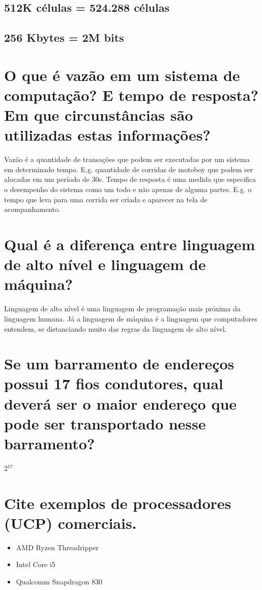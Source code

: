 \documentclass[11pt]{article}
\begin{document}
\subsection{512K células = 524.288 células}
\label{sec:org338395f}
\subsection{256 Kbytes = 2M bits}
\label{sec:orgb41b5b3}
\section{O que é vazão em um sistema de computação? E tempo de resposta? Em que circunstâncias são utilizadas estas informações?}
\label{sec:orgae451bd}
Vazão é a quantidade de transações que podem ser executadas por um sistema em
determinado tempo. E.g. quantidade de corridas de motoboy que podem ser alocadas
em um período de 30s.
Tempo de resposta é uma medida que especifica o desempenho do sistema como um
todo e não apenas de alguma partes. E.g. o tempo que leva para uma corrida ser
criada e aparecer na tela de acompanhamento.
\section{Qual é a diferença entre linguagem de alto nível e linguagem de máquina?}
\label{sec:org16e6fc2}
Linguagem de alto nível é uma linguagem de programação mais próxima da linguagem
humana. Já a linguagem de máquina é a linguagem que computadores entendem, se
distanciando muito das regras da linguagem de alto nível.
\section{Se um barramento de endereços possui 17 fios condutores, qual deverá ser o maior endereço que pode ser transportado nesse barramento?}
\label{sec:org9c9f886}
2\(^{\text{17}}\)
\section{Cite exemplos de processadores (UCP) comerciais.}
\label{sec:org7c3181b}
\begin{itemize}
\item AMD Ryzen Threadripper
\item Intel Core i5
\item Qualcomm Snapdragon 830
\end{itemize}
\end{document}
